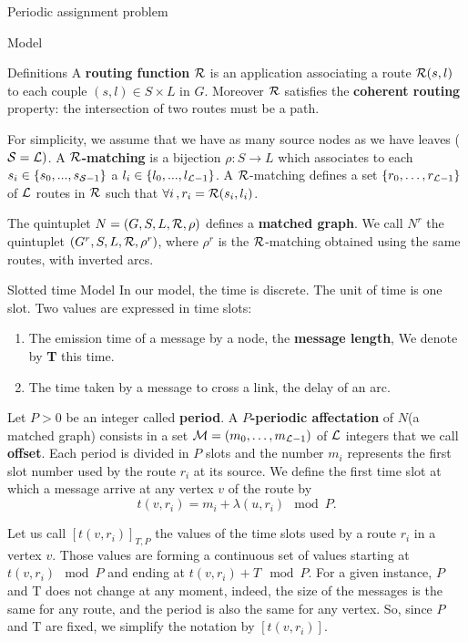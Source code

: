 \documentclass[a4paper,10pt]{report}
\newcommand\rmatching{${\cal R}$-matching\xspace}
\newcommand\matchedgraph{{\bf matched graph}}
\begin{document}
\begin{chapter}{Periodic assignment problem}
\begin{section}{Model}
\begin{subsection}{Definitions}
A {\bf routing function}  ${\cal R}$ is an application associating a route  ${\cal R}(s,l)$ to each couple $(s,l) \in S \times L$ in $G$.
Moreover ${\cal R}$ satisfies the {\bf coherent routing} property: the intersection of two routes must be a path.

For simplicity, we assume that we have as many source nodes as we have leaves (${\cal S} = {\cal L})$.
A {\bf ${\cal R}$-matching} is a bijection $\rho:S\rightarrow L$ which associates to each $s_i \in \{s_0,...,s_{{\cal S}-1}\}$ 
a $l_i \in \{l_0,...,l_{{\cal L}-1}\}$.
A \rmatching defines a set $\{r_0, \ldots ,r_{{\cal L}-1}\}$ of ${\cal L}$ routes in ${\cal R}$ such that $\forall i\,, r_i = {\cal R}(s_i,l_i)$.

The quintuplet $N=(G,S,L,{\cal R},\rho)$ defines a \matchedgraph. We call $N^r$ the quintuplet $(G^r,S,L,{\cal R},\rho^r)$, 
where $\rho^r$ is the \rmatching obtained using the same routes, with inverted arcs.

\end{subsection}
\begin{subsection}{Slotted time Model}
\label{slottedtime}
In our model, the time is discrete. The unit of time is one slot. Two values are expressed in time slots: 
\begin{enumerate}
 \item The emission time of a message by a node, the {\bf message length}, We denote by {\bf T} this time.
 \item The time taken by a message to cross a link, the delay of an arc.
\end{enumerate}

Let $P>0$ be an integer called {\bf period}. 
A {\bf $P$-periodic affectation} of $N$(a matched graph) consists in a set  ${\cal M}=(m_0, \ldots ,m_{{\cal L}-1})$
of ${\cal L}$ integers that we call {\bf offset}. 
Each period is divided in $P$ slots and the number $m_i$ represents the first slot number used by the route $r_i$ at its source.
We define the first time slot at which a message arrive at any vertex $v$ of the route by $$t(v,r_i) = m_i+\lambda(u,r_i) \mod P.$$

Let us call $[t(v,r_i)]_{T,P}$ the values of the time slots used by a route $r_i$ in a vertex $v$. 
Those values are forming a continuous set of values starting at $t(v,r_i) \mod P$ and ending at $t(v,r_i) + T \mod P$.
For a given instance, $P$ and T does not change at any moment, indeed, the size of the messages is the same for any route, and the period is also the same for any vertex.
So, since $P$ and T are fixed, we simplify the notation by $[t(v,r_i)]$.


\end{subsection}
\end{section}
\end{chapter}
\end{document}
